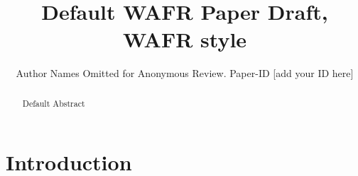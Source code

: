 \documentclass{util/wafr/llncs}
\begin{document}
\title{Default WAFR Paper Draft, WAFR style}

\author{Author Names Omitted for Anonymous Review. Paper-ID [add your ID here]}
\maketitle
\begin{abstract}
        Default Abstract
\end{abstract}
\section{Introduction}



\end{document}
